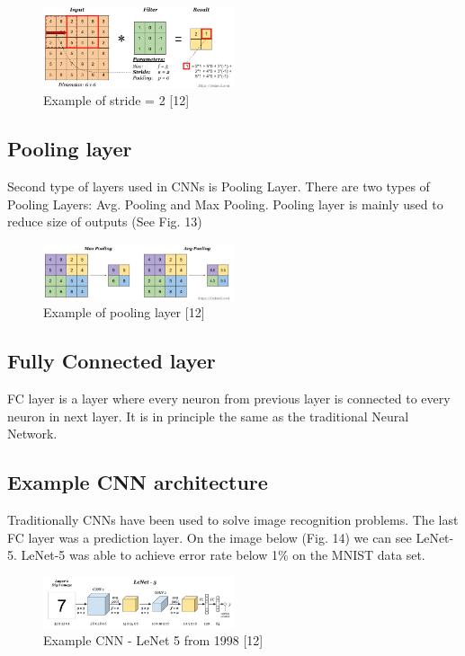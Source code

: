 \documentclass[letterpaper, 10 pt, conference]{ieeeconf}  %
\begin{document}
\begin{figure}[!ht]
	\centering
    \includegraphics[width=0.5\textwidth]{Pictures/stride.png}
	\caption{Example of stride = 2 [12]}
\end{figure}

\subsection{Pooling layer}

Second type of layers used in CNNs is Pooling Layer. There are two types of Pooling Layers: Avg. Pooling and Max Pooling. Pooling layer is mainly used to reduce size of outputs (See Fig. 13)

\begin{figure}[!ht]
	\centering
    \includegraphics[width=0.5\textwidth]{Pictures/pooling-layer3.png}
	\caption{Example of pooling layer [12]}
\end{figure}


\subsection{Fully Connected layer}

FC layer is a layer where every neuron from previous layer is connected to every neuron in next layer. It is in principle the same as the traditional Neural Network.

\subsection{Example CNN architecture}
Traditionally CNNs have been used to solve image recognition problems. The last FC layer was a prediction layer. On the image below (Fig. 14) we can see LeNet-5. LeNet-5 was able to achieve error rate below 1\% on the MNIST data set. 

\begin{figure}[!ht]
	\centering
    \includegraphics[width=0.5\textwidth]{Pictures/lenet-52.png}
	\caption{Example CNN - LeNet 5 from 1998 [12]}
\end{figure}
\end{document}
